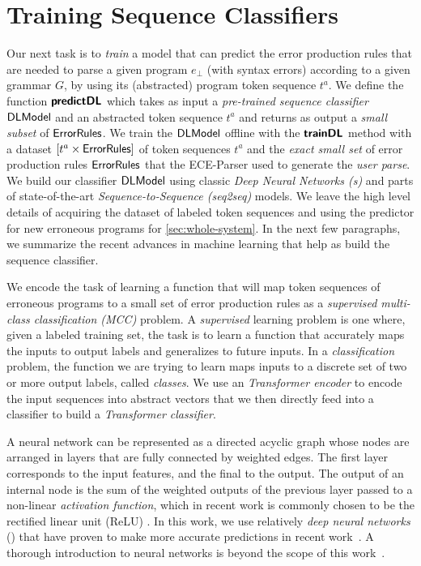 \section{Training Sequence Classifiers}
\label{sec:seq-classifiers}

Our next task is to \emph{train} a model that can predict the error production
rules that are needed to parse a given program $e_{\bot}$ (with syntax errors)
according to a given grammar $G$, by using its (abstracted) program token
sequence $t^a$.
%
We define the function $\bm{\mathsf{predictDL}}$ which takes as input a \emph{pre-trained
sequence classifier} $\mathsf{DLModel}$ and an abstracted token sequence $t^a$ and returns
as output a \emph{small subset} of $\mathsf{ErrorRules}$.
%
We train the $\mathsf{DLModel}$ offline with the $\bm{\mathsf{trainDL}}$ method with a dataset
$[t^a \times \mathsf{ErrorRules}]$ of token sequences $t^a$ and the \emph{exact
small set} of error production rules $\mathsf{ErrorRules}$ that the ECE-Parser used
to generate the \emph{user parse}. We build our classifier $\mathsf{DLModel}$ using
classic \emph{Deep Neural Networks (\dnn{}s)} and parts of state-of-the-art
\emph{Sequence-to-Sequence (seq2seq)} models. We leave the high level details of
acquiring the dataset of labeled token sequences and using the predictor for new
erroneous programs for \autoref{sec:whole-system}. In the next few paragraphs,
we summarize the recent advances in machine learning that help as build the
sequence classifier.

We encode the task of learning a function that will map token sequences of
erroneous programs to a small set of error production rules as a
\emph{supervised multi-class classification (MCC)} problem. A \emph{supervised}
learning problem is one where, given a labeled training set, the task is to
learn a function that accurately maps the inputs to output labels and
generalizes to future inputs. In a \emph{classification} problem, the function
we are trying to learn maps inputs to a discrete set of two or more output
labels, called \emph{classes}. We use an \emph{Transformer encoder} to encode
the input sequences into abstract vectors that we then directly feed into a
\emph{\dnn} classifier to build a \emph{Transformer classifier}.

A neural network can be represented as a directed acyclic graph whose nodes are
arranged in layers that are fully connected by weighted edges. The first layer
corresponds to the input features, and the final to the output. The output of an
internal node is the sum of the weighted outputs of the previous layer passed to
a non-linear \emph{activation function}, which in recent work is commonly chosen
to be the rectified linear unit (ReLU) \citep{Nair2010-xg}. In this work, we use
relatively \emph{deep neural networks} (\dnn) that have proven to make more
accurate predictions in recent work~\citep{Schmidhuber_2015}. A thorough
introduction to neural networks is beyond the scope of this
work~\citep{Hastie2009-bn, Nielsen2015-pu}.

